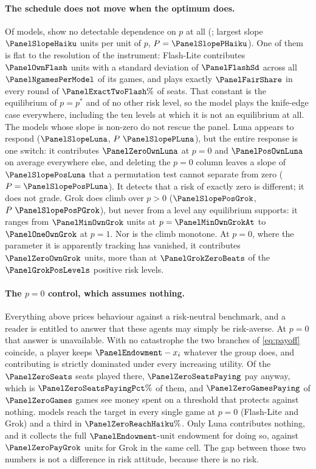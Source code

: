 \paragraph{The schedule does not move when the optimum does.}
Of \PanelNmodelsWord{} models, \PanelNFlatWord{} show no detectable dependence on $p$ at
all (\PanelFlatModels{}; largest slope $\PanelSlopeHaiku$ units per unit of $p$,
$P=\PanelSlopePHaiku$). One of them is flat to the resolution of the instrument:
Flash-Lite contributes $\PanelOwnFlash$ units with a standard deviation of
$\PanelFlashSd$ across all $\PanelNgamesPerModel$ of its games, and plays exactly
$\PanelFairShare$ in every round of $\PanelExactTwoFlash\%$ of seats. That constant
is the equilibrium of $p=p^{*}$ and of no other risk level, so the model plays the
knife-edge case everywhere, including the ten levels at which it is not an equilibrium at
all. The \PanelNMovedWord{} models whose slope is non-zero do not rescue the panel.
Luna appears to respond ($\PanelSlopeLuna$, $P~\PanelSlopePLuna$), but the
entire response is one switch: it contributes $\PanelZeroOwnLuna$ at $p=0$ and
$\PanelPosOwnLuna$ on average everywhere else, and deleting the $p=0$ column leaves a slope
of $\PanelSlopePosLuna$ that a permutation test cannot separate from zero
($P=\PanelSlopePosPLuna$). It detects that a risk of exactly zero is different; it does not
grade. Grok does climb over $p>0$ ($\PanelSlopePosGrok$, $P~\PanelSlopePosPGrok$), but never
from a level any equilibrium supports: it ranges from $\PanelMinOwnGrok$ units at
$p=\PanelMinOwnGrokAt$ to $\PanelOneOwnGrok$ at $p=1$. Nor is the climb monotone. At
$p=0$, where the parameter it is apparently tracking has vanished, it contributes
$\PanelZeroOwnGrok$ units, more than at $\PanelGrokZeroBeats$ of the
$\PanelGrokPosLevels$ positive risk levels.

\paragraph{The $p=0$ control, which assumes nothing.}
Everything above prices behaviour against a risk-neutral benchmark, and a reader is
entitled to answer that these agents may simply be risk-averse. At $p=0$ that answer is
unavailable. With no catastrophe the two branches of \eqref{eq:payoff} coincide, a player
keeps $\PanelEndowment-x_i$ whatever the group does, and contributing is strictly dominated
under every increasing utility. Of the $\PanelZeroSeats$ seats played there,
$\PanelZeroSeatsPaying$ pay anyway, which is $\PanelZeroSeatsPayingPct\%$ of them, and
$\PanelZeroGamesPaying$ of $\PanelZeroGames$ games see money spent on a threshold that
protects against nothing. \PanelZeroModelsAtCeilingWordCap{} models reach the target in
every single game at $p=0$
(Flash-Lite and Grok) and a third in
$\PanelZeroReachHaiku\%$. Only Luna contributes nothing, and it collects
the full $\PanelEndowment$-unit endowment for doing so, against $\PanelZeroPayGrok$ units
for Grok in the same cell. The gap between those two numbers is
not a difference in risk attitude, because there is no risk.

